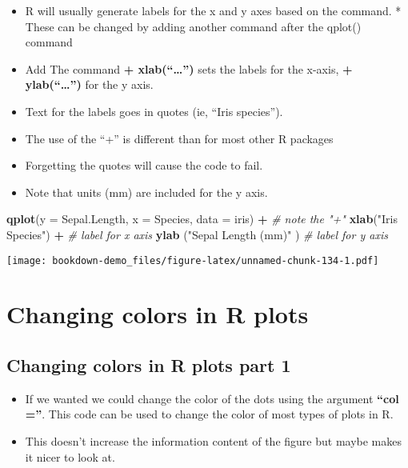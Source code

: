 \documentclass[]{book}
\newenvironment{Shaded}{\begin{snugshade}}{\end{snugshade}}
\newcommand{\KeywordTok}[1]{\textcolor[rgb]{0.13,0.29,0.53}{\textbf{#1}}}
\newcommand{\DataTypeTok}[1]{\textcolor[rgb]{0.13,0.29,0.53}{#1}}
\newcommand{\StringTok}[1]{\textcolor[rgb]{0.31,0.60,0.02}{#1}}
\newcommand{\CommentTok}[1]{\textcolor[rgb]{0.56,0.35,0.01}{\textit{#1}}}
\newcommand{\OperatorTok}[1]{\textcolor[rgb]{0.81,0.36,0.00}{\textbf{#1}}}
\newcommand{\NormalTok}[1]{#1}
\providecommand{\tightlist}{%
  \setlength{\itemsep}{0pt}\setlength{\parskip}{0pt}}
\theoremstyle{definition}
\theoremstyle{definition}
\theoremstyle{definition}
\theoremstyle{remark}
\begin{document}
\begin{itemize}
\tightlist
\item
  R will usually generate labels for the x and y axes based on the
  command. * These can be changed by adding another command after the
  qplot() command
\item
  Add The command \textbf{+ xlab(``\ldots{}'')} sets the labels for the
  x-axis, \textbf{+ ylab(``\ldots{}'')} for the y axis.
\item
  Text for the labels goes in quotes (ie, ``Iris species'').
\item
  The use of the ``+'' is different than for most other R packages
\item
  Forgetting the quotes will cause the code to fail.\\
\item
  Note that units (mm) are included for the y axis.
\end{itemize}

\begin{Shaded}
\begin{Highlighting}[]
\KeywordTok{qplot}\NormalTok{(}\DataTypeTok{y =}\NormalTok{ Sepal.Length,}
      \DataTypeTok{x =}\NormalTok{ Species,    }
        \DataTypeTok{data =}\NormalTok{ iris) }\OperatorTok{+}\StringTok{         }\CommentTok{# note the "+"}
\StringTok{  }\KeywordTok{xlab}\NormalTok{(}\StringTok{"Iris Species"}\NormalTok{) }\OperatorTok{+}\StringTok{       }\CommentTok{# label for x axis}
\StringTok{  }\KeywordTok{ylab}\NormalTok{ (}\StringTok{"Sepal Length (mm)"}\NormalTok{ )  }\CommentTok{# label for y axis}
\end{Highlighting}
\end{Shaded}

\texttt{[image: bookdown-demo\_files/figure-latex/unnamed-chunk-134-1.pdf]}

\section{Changing colors in R plots}\label{changing-colors-in-r-plots}

\subsection{Changing colors in R plots part
1}\label{changing-colors-in-r-plots-part-1}

\begin{itemize}
\tightlist
\item
  If we wanted we could change the color of the dots using the argument
  \textbf{``col =''}. This code can be used to change the color of most
  types of plots in R.\\
\item
  This doesn't increase the information content of the figure but maybe
  makes it nicer to look at.
\end{itemize}
\end{document}

